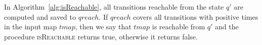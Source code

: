 { In Algorithm~\ref{alg:isReachable}, all transitions reachable from the state $q'$ are computed and saved to $qreach$. If $qreach$ covers all transitions with positive times in the input map $tmap$, then we say that $tmap$ is reachable from $q'$ and the procedure \textsc{isReachable} returns true, otherwise it returns false.  
}

